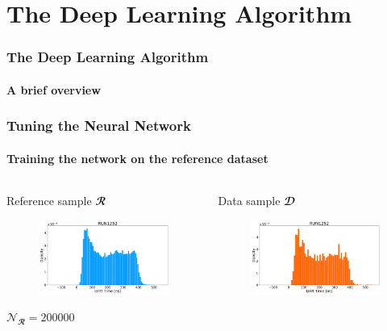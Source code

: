 \documentclass{beamer}
\begin{document}
	\section{The Deep Learning Algorithm}
	\begin{frame}
		\frametitle{The Deep Learning Algorithm}
		\framesubtitle{A brief overview}
		
	\end{frame}


	\begin{frame}
		\frametitle{Tuning the Neural Network}
		\framesubtitle{Training the network on the reference dataset}

		\begin{columns}
			\begin{column}{0.5\textwidth}
				\begin{alertblock}{Reference sample $\mathbfcal{R}$}
					\begin{figure}
						\centering 
						\includegraphics[width=1.0\textwidth]{./Images/reference.pdf}
					\end{figure}
					$\mathcal{N}_{\mathbfcal{R}}=200000$
				\end{alertblock}
			\end{column}
			\begin{column}{0.5\textwidth}
				\begin{alertblock}{Data sample $\mathbfcal{D}$}
					\begin{figure}
						\centering 
						\includegraphics[width=1.0\textwidth]{./Images/sampled_ref.pdf}

\end{figure}
\end{alertblock}
\end{column}
\end{columns}
\end{frame}
\end{document}
